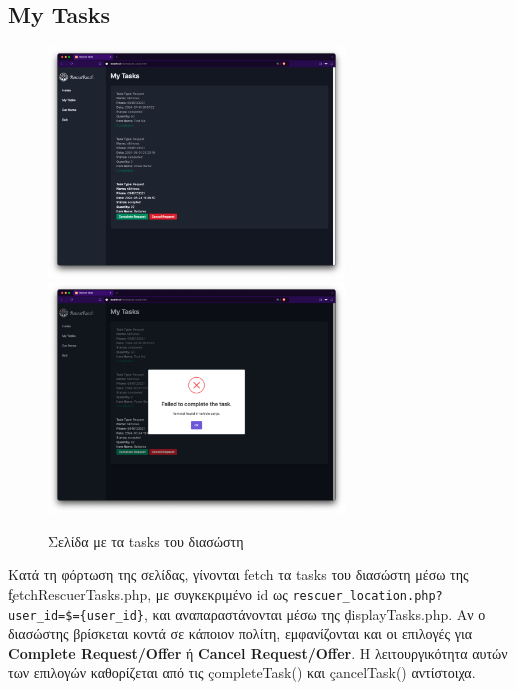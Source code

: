     \subsection{My Tasks}
        \begin{figure}[H] \noindent \centering
            \includegraphics[width=0.7\textwidth]{img/rescuer-tasks}
            \includegraphics[width=0.7\textwidth]{img/rescuer-tasks-fail}
            \caption{Σελίδα με τα tasks του διασώστη}
        \end{figure}
        Κατά τη φόρτωση της σελίδας, γίνονται fetch τα tasks του διασώστη μέσω της \c{fetchRescuerTasks.php}, με συγκεκριμένο id ως \verb|rescuer_location.php?user_id=$={user_id}|,
            και αναπαραστάνονται μέσω της \c{displayTasks.php}.
        Αν ο διασώστης βρίσκεται κοντά σε κάποιον πολίτη, εμφανίζονται και οι επιλογές για \textbf{Complete Request/Offer} ή \textbf{Cancel Request/Offer}.
        Η λειτουργικότητα αυτών των επιλογών καθορίζεται από τις \c{completeTask()} και \c{cancelTask()} αντίστοιχα.

